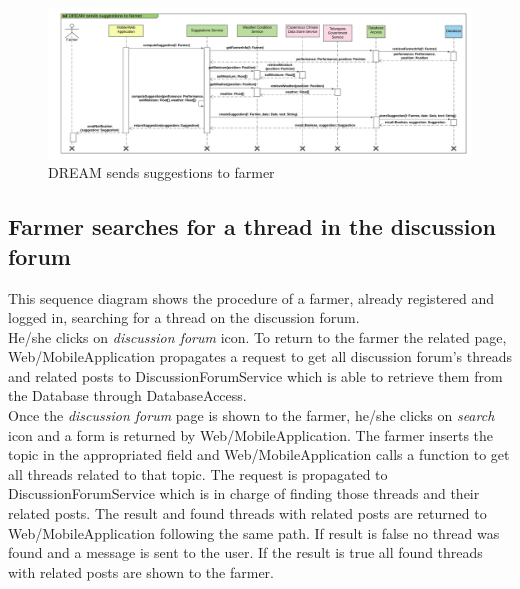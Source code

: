 \newpage
\begin{landscape}
\begin{figure}[t!]
\vspace*{2cm}
\noindent
\centering
\centerline{\includegraphics[scale= 0.108]{./Images/Sequence diagram/DREAM sends suggestions to farmer.png}}
    \caption{DREAM sends suggestions to farmer}
    \vspace*{-12cm}
\end{figure}
\fillandplacepagenumber
\end{landscape}

\subsection{Farmer searches for a thread in the discussion forum}

This sequence diagram shows the procedure of a farmer, already registered and logged in, searching for a thread on the discussion forum.\\
He/she clicks on \textit{discussion forum} icon. To return to the farmer the related page, Web/MobileApplication propagates a request to get all discussion forum's threads and related posts to DiscussionForumService which is able to retrieve them from the Database through DatabaseAccess.\\ 
Once the \textit{discussion forum} page is shown to the farmer, he/she clicks on \textit{search} icon and a form is returned by Web/MobileApplication. The farmer inserts the topic in the appropriated field and Web/MobileApplication calls a function to get all threads related to that topic. The request is propagated to DiscussionForumService which is in charge of finding those threads and their related posts. The result and found threads with related posts are returned to Web/MobileApplication following the same path. If result is false no thread was found and a message is sent to the user. If the result is true all found threads with related posts are shown to the farmer.

